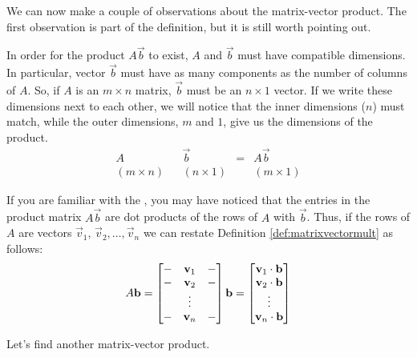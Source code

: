 \documentclass{ximera}
\begin{document}
\begin{example}
\begin{explanation}
\end{explanation}
\end{example}
We can now make a couple of observations about the matrix-vector product.  The first observation is part of the definition, but it is still worth pointing out.
\begin{observation}
In order for the product $A\vec{b}$ to exist, $A$ and $\vec{b}$ must have compatible dimensions.  In particular, vector $\vec{b}$ must have as many components as the number of columns of $A$.  So, if $A$ is an $m\times n$ matrix, $\vec{b}$ must be an $n\times 1$ vector.  If we write these dimensions next to each other, we will notice that the inner dimensions ($n$) must match, while the outer dimensions, $m$ and $1$, give us the dimensions of the product.
$$\begin{array}{ccccc}
A& & \vec{b} &=& A\vec{b}\\
(m\times n) & &(n\times 1) & &(m\times 1)
\end{array}$$
\end{observation}

\begin{observation} If you are familiar with the , you may have noticed that the entries in the product matrix $A\vec{b}$ are dot products of the rows of $A$ with $\vec{b}$.  Thus, if the rows of $A$ are vectors $\vec{v}_1$, $\vec{v}_2,\ldots ,\vec{v}_n$ we can restate Definition \ref{def:matrixvectormult} as follows:
$$A{\bf b}=\begin{bmatrix}-&{\bf v}_1&-\\-&{\bf v}_2&-\\ &\vdots & \\-&{\bf v}_n &-\end{bmatrix}{\bf b}=\begin{bmatrix}{\bf v}_1\cdot{\bf b}\\{\bf v}_2\cdot{\bf b}\\\vdots\\{\bf v}_n\cdot{\bf b}\end{bmatrix}$$
\end{observation}

Let's find another matrix-vector product.
\end{document}
